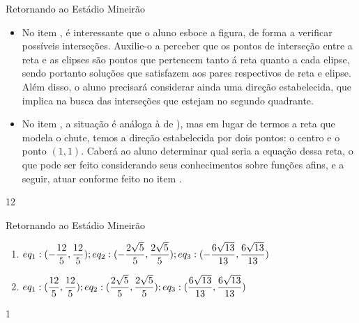 \clearmargin
\begin{sugestions}{Retornando ao Estádio Mineirão}
{
\begin{itemize}
\item No item , é interessante que o aluno esboce a figura, de forma a verificar possíveis interseções. Auxilie-o a perceber que os pontos de interseção entre a reta e as elipses são pontos que pertencem tanto á reta quanto a cada elipse, sendo portanto soluções que satisfazem aos pares respectivos de reta e elipse. Além disso, o aluno precisará considerar ainda uma direção estabelecida, que implica na busca das interseções que estejam no segundo quadrante.
\item No item  , a situação é análoga à de ), mas em lugar de termos a reta que modela o chute, temos a direção estabelecida por dois pontos: o centro e o ponto $(1,1)$. Caberá ao aluno determinar qual seria a equação dessa reta, o que pode ser feito considerando seus conhecimentos sobre funções afins, e a seguir, atuar conforme feito no item .
\end{itemize}
}{1}{2}
\end{sugestions}
\begin{answer}{Retornando ao Estádio Mineirão}
{
\begin{enumerate}
\item $\displaystyle eq_1:(-\frac{12}{5},\frac{12}{5} );\ \newline eq_2:(-\frac{2\sqrt{5}}{5},\frac{2\sqrt{5}}{5});\  \newline eq_3:(-\frac{6\sqrt{13}}{13},\frac{6\sqrt{13}}{13})$
\item $\displaystyle eq_1:(\frac{12}{5},\frac{12}{5} );\ \newline eq_2:(\frac{2\sqrt{5}}{5},\frac{2\sqrt{5}}{5});\  \newline eq_3:(\frac{6\sqrt{13}}{13},\frac{6\sqrt{13}}{13})$
\end{enumerate}
}{1}
\end{answer}
\label{\detokenize{AF107-2:explorando-sistemas-de-equações}}\label{\detokenize{AF107-2::doc}}

